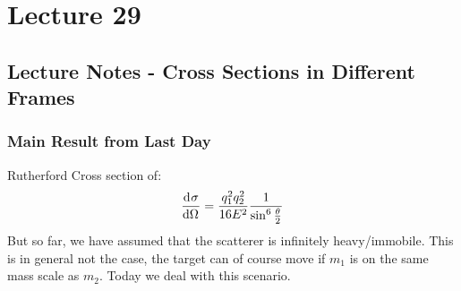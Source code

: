 \section{Lecture 29}
\subsection{Lecture Notes - Cross Sections in Different Frames}
\subsubsection{Main Result from Last Day}
Rutherford Cross section of:
\[\dod{\sigma}{\Omega} = \frac{q_1^2q_2^2}{16E^2}\frac{1}{\sin^6\frac{\theta}{2}}\]
But so far, we have assumed that the scatterer is infinitely heavy/immobile. This is in general not the case, the target can of course move if $m_1$ is on the same mass scale as $m_2$. Today we deal with this scenario.

